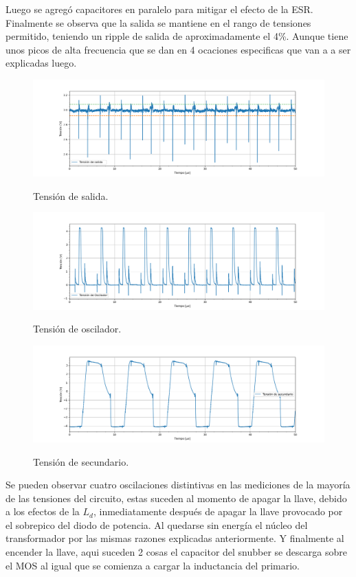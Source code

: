 Luego se agregó capacitores en paralelo para mitigar el efecto de la ESR. Finalmente se observa que la salida se mantiene en el rango de tensiones permitido, teniendo un ripple de salida de aproximadamente el 4\%.  Aunque tiene unos picos de alta frecuencia que se dan en 4 ocaciones especificas que van a a ser explicadas luego.

\begin{figure}[H]
	\centering	\includegraphics[width=0.9\linewidth]{ImagenesParteIV/Vout.png}
	\label{fig:vout_4}
	\caption{Tensión de salida.}
\end{figure}

\begin{figure}[H]
	\centering
	\includegraphics[width=0.9\linewidth]{ImagenesParteIV/Vosc.png}
	\label{fig:vosc4}
	\caption{Tensión de oscilador.}
\end{figure}

\begin{figure}[H]
	\centering
	\includegraphics[width=0.9\linewidth]{ImagenesParteIV/Vsec.png}
	\label{fig:vsec_4}
	\caption{Tensión de secundario.}
\end{figure}
Se pueden observar cuatro oscilaciones distintivas en las mediciones de la mayoría de las tensiones del circuito, estas suceden al momento de apagar la llave, debido a los efectos de la $L_d$, inmediatamente después de apagar la llave provocado por el sobrepico del diodo de potencia. Al quedarse sin energía el núcleo del transformador por las mismas razones explicadas anteriormente. Y finalmente al encender la llave, aqui suceden 2 cosas el capacitor del snubber se descarga sobre el MOS al igual que se comienza a cargar la inductancia del primario.
%